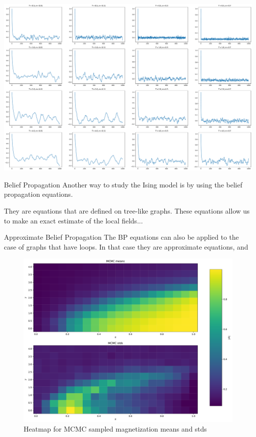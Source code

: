 \documentclass[handout]{beamer}
\begin{document}
\begin{frame}[plain]
    \includegraphics[width=\textwidth]{wolff_mags}
\end{frame}

\begin{frame}{Belief Propagation}
    Another way to study the Ising model is by using the \alert{belief
    propagation} equations.

    They are equations that are defined on tree-like graphs. These equations
    allow us to make an exact estimate of the local fields...
\end{frame}

\begin{frame}{Approximate Belief Propagation}
    The BP equations can also be applied to the case of graphs that have loops.
    In that case they are approximate equations, and
\end{frame}

\begin{frame}[plain]
    \begin{figure}
        \centering
        \includegraphics[width=.8\textwidth]{mcmc_heatmap}
        \caption{Heatmap for MCMC sampled magnetization means and stds}
        \label{fig:mcmc_heatmap}
    \end{figure}
\end{frame}
\end{document}
